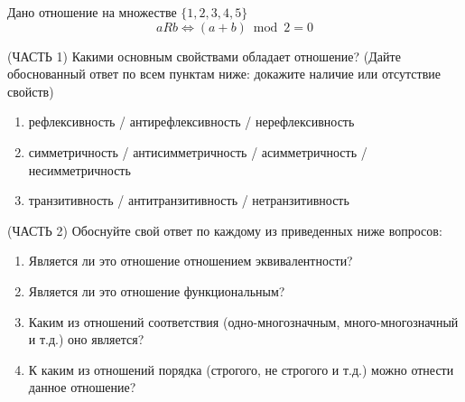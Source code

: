 \question
Дано отношение на множестве $\{1, 2, 3, 4, 5\}$ 
\begin{equation*}
	aRb \iff (a+b) \bmod 2 =0
\end{equation*}

(ЧАСТЬ 1) Какими основным свойствами обладает отношение? (Дайте обоснованный ответ по всем пунктам ниже: докажите наличие или отсутствие свойств)  
\begin{enumerate}
	\renewcommand{\labelenumi}{\alph{enumi})}
	\item рефлексивность / антирефлексивность / нерефлексивность
	\item симметричность / антисимметричность / асимметричность / несимметричность
	\item транзитивность / антитранзитивность / нетранзитивность
\end{enumerate}

(ЧАСТЬ 2) Обоснуйте свой ответ по каждому из приведенных ниже вопросов:
\begin{enumerate}
	\renewcommand{\labelenumi}{\alph{enumi})}
    \item Является ли это отношение отношением эквивалентности?
    \item Является ли это отношение функциональным?
    \item Каким из отношений соответствия (одно-многозначным, много-многозначный и т.д.) оно является?
    \item К каким из отношений порядка (строгого, не строгого и т.д.) можно отнести данное отношение?
\end{enumerate}

